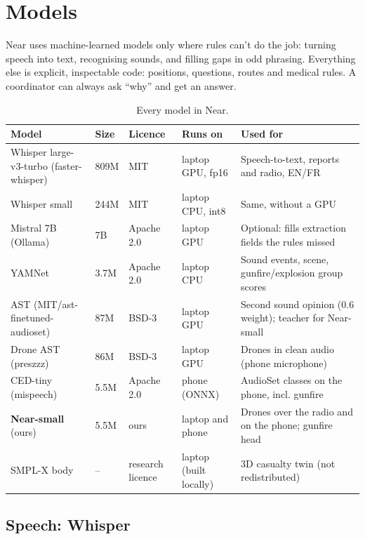 \chapter{Models}\label{ch:models}

Near uses machine-learned models only where rules can't do the job: turning speech into text, recognising
sounds, and filling gaps in odd phrasing. Everything else is explicit, inspectable code: positions, questions,
routes and medical rules. A coordinator can always ask ``why'' and get an answer.

\begin{table}[htbp]\centering\small
\caption{Every model in Near.}\label{tab:models}
\begin{tabularx}{\linewidth}{>{\raggedright}p{3.0cm}>{\raggedright}p{1.3cm}>{\raggedright}p{2.2cm}>{\raggedright}p{2.2cm}X}
\toprule
Model & Size & Licence & Runs on & Used for\\
\midrule
Whisper large-v3-turbo (faster-whisper) & 809M & MIT & laptop GPU, fp16 & Speech-to-text, reports and radio, EN/FR\\
Whisper small & 244M & MIT & laptop CPU, int8 & Same, without a GPU\\
Mistral 7B (Ollama) & 7B & Apache 2.0 & laptop GPU & Optional: fills extraction fields the rules missed\\
YAMNet & 3.7M & Apache 2.0 & laptop CPU & Sound events, scene, gunfire/explosion group scores\\
AST (MIT/ast-finetuned-audioset) & 87M & BSD-3 & laptop GPU & Second sound opinion (0.6 weight); teacher for Near-small\\
Drone AST (preszzz) & 86M & BSD-3 & laptop GPU & Drones in clean audio (phone microphone)\\
CED-tiny (mispeech) & 5.5M & Apache 2.0 & phone (ONNX) & AudioSet classes on the phone, incl. gunfire\\
\textbf{Near-small} (ours) & 5.5M & ours & laptop and phone & Drones over the radio and on the phone; gunfire head\\
SMPL-X body & -- & research licence & laptop (built locally) & 3D casualty twin (not redistributed)\\
\bottomrule
\end{tabularx}
\end{table}

\section{Speech: Whisper}


